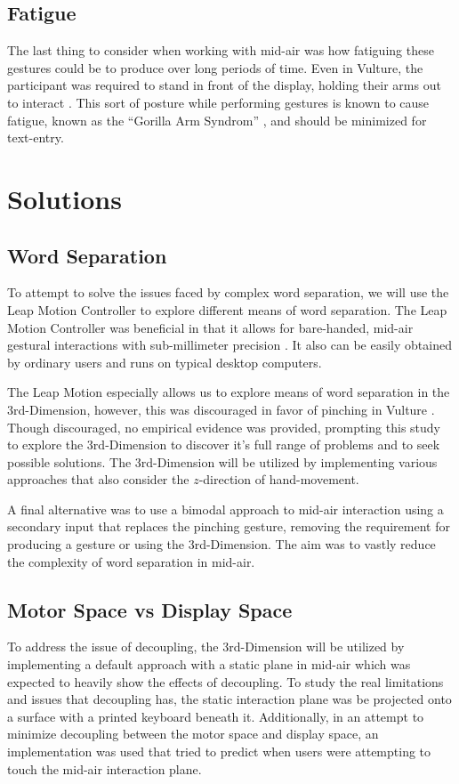 \subsection{Fatigue}
The last thing to consider when working with mid-air was how fatiguing these gestures could be to produce over long periods of time. Even in Vulture, the participant was required to stand in front of the display, holding their arms out to interact \cite{ref_vulture}. This sort of posture while performing gestures is known to cause fatigue, known as the ``Gorilla Arm Syndrom'' \cite{ref_gorilla_arm,ref_fatigue_limitation}, and should be minimized for text-entry.

\section{Solutions}
\subsection{Word Separation}
To attempt to solve the issues faced by complex word separation, we will use the Leap Motion Controller to explore different means of word separation. The Leap Motion Controller was beneficial in that it allows for bare-handed, mid-air gestural interactions with sub-millimeter precision \cite{ref_leap_device_evaluation_1,ref_leap_device_evaluation_2}. It also can be easily obtained by ordinary users and runs on typical desktop computers.

The Leap Motion especially allows us to explore means of word separation in the 3rd-Dimension, however, this was discouraged in favor of pinching in Vulture \cite{ref_vulture}. Though discouraged, no empirical evidence was provided, prompting this study to explore the 3rd-Dimension to discover it's full range of problems and to seek possible solutions. The 3rd-Dimension will be utilized by implementing various approaches that also consider the $z$-direction of hand-movement.

A final alternative was to use a bimodal approach to mid-air interaction using a secondary input that replaces the pinching gesture, removing the requirement for producing a gesture or using the 3rd-Dimension. The aim was to vastly reduce the complexity of word separation in mid-air.

\subsection{Motor Space vs Display Space}
To address the issue of decoupling, the 3rd-Dimension will be utilized by implementing a default approach with a static plane in mid-air which was expected to heavily show the effects of decoupling. To study the real limitations and issues that decoupling has, the static interaction plane was be projected onto a surface with a printed keyboard beneath it. Additionally, in an attempt to minimize decoupling between the motor space and display space, an implementation was used that tried to predict when users were attempting to touch the mid-air interaction plane.


